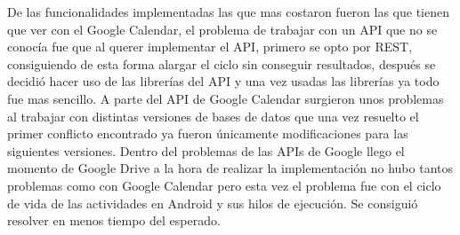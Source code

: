 De las funcionalidades implementadas las que mas costaron fueron las que tienen que ver con el Google Calendar, el problema de trabajar con un API que no se conocía fue que al querer implementar el API, primero se opto por REST, consiguiendo de esta forma alargar el ciclo sin conseguir resultados, después se decidió hacer uso de las librerías del API y una vez usadas las librerías ya todo fue mas sencillo. A parte del API de Google Calendar surgieron unos problemas al trabajar con distintas versiones de bases de datos que una vez resuelto el primer conflicto encontrado ya fueron únicamente modificaciones para las siguientes versiones.
Dentro del problemas de las APIs de Google llego el momento de Google Drive a la hora de realizar la implementación no hubo tantos problemas como con Google Calendar pero esta vez el problema fue con el ciclo de vida de las actividades en Android y sus hilos de ejecución. Se consiguió resolver en menos tiempo del esperado.
